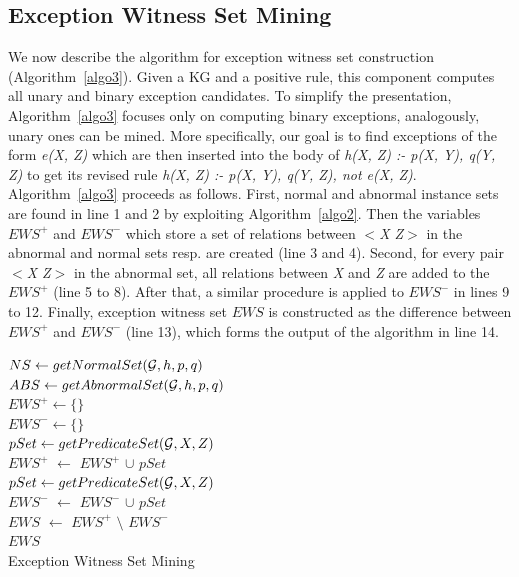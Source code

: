 \subsection{Exception Witness Set Mining}

We now describe the algorithm for exception witness set construction (Algorithm~\ref{algo3}). Given a KG and a positive rule, this component computes all unary and binary exception candidates. To simplify the presentation, Algorithm~\ref{algo3} focuses only on computing binary exceptions, analogously, unary ones can be mined. More specifically, our goal is to find exceptions of the form \textit{e(X, Z)} which are then inserted into the body of \textit{h(X, Z) :- p(X, Y), q(Y, Z)} to get its revised rule \textit{h(X, Z) :- p(X, Y), q(Y, Z), not e(X, Z)}. Algorithm~\ref{algo3} proceeds as follows. First, normal and abnormal instance sets are found in line 1 and 2 by exploiting Algorithm~\ref{algo2}. Then the variables $EWS^+$ and $EWS^-$ which store a set of relations between \textit{$<$X Z$>$} in the abnormal and normal sets resp. are created (line 3 and 4). Second, for every pair \textit{$<$X Z$>$} in the abnormal set, all relations between \textit{X} and \textit{Z} are added to the $EWS^+$ (line 5 to 8). After that, a similar procedure is applied to $EWS^-$ in lines 9 to 12. Finally, exception witness set $EWS$ is constructed as the difference between $EWS^+$ and $EWS^-$ (line 13), which forms the output of the algorithm in line 14.

\IncMargin{1.5em}
\begin{algorithm}[H]
\DontPrintSemicolon
\SetAlgoLined
{}
\BlankLine
$NS \leftarrow getNormalSet(\mathcal{G}, h, p, q)$\\
$ABS \leftarrow getAbnormalSet(\mathcal{G}, h, p, q)$\\
$EWS^+ \leftarrow \{\}$\\
$EWS^- \leftarrow \{\}$\\
\BlankLine
{} {
	$pSet \leftarrow getPredicateSet(\mathcal{G}, X, Z)$\\
	$EWS^+$ $\leftarrow$ $EWS^+$ $\cup$ $pSet$\\
}
 {
	$pSet \leftarrow getPredicateSet(\mathcal{G}, X, Z)$\\
	$EWS^-$ $\leftarrow$ $EWS^-$ $\cup$ $pSet$\\
}
$EWS$ $\leftarrow$ $EWS^+$ $\setminus$ $EWS^-$\\
\Return $EWS$\\
\caption{Exception Witness Set Mining}
\label{algo3}
\end{algorithm}
\DecMargin{1.5em}

